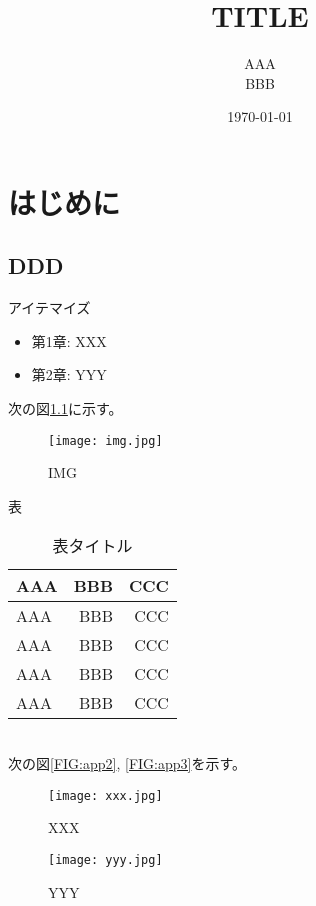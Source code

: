 \documentclass[a4paper,12pt,uplatex]{jsreport}
\title{TITLE}
\author{AAA\\BBB}
\date{\today}
\begin{document}
\maketitle
\tableofcontents

\chapter{はじめに}
\section{DDD}

アイテマイズ
\begin{itemize}
	\item 第1章: XXX
	\item 第2章: YYY
\end{itemize}


次の図\ref{FIG:p1}に示す。
\begin{figure}[h]
	\fontsize{12pt}{0cm}\selectfont
	\centering
	\renewcommand{\figurename}{図}
	\texttt{[image: img.jpg]}
	\caption{IMG}
	\label{FIG:p1}
\end{figure}

表
\begin{table}[htbp]
    \caption{表タイトル}
    \centering
    \begin{tabular}{|l||r|r|}
        \hline
        AAA & BBB & CCC\\
        \hline
        \hline
        AAA & BBB & CCC\\
        \hline
        AAA & BBB & CCC\\
        \hline
        AAA & BBB & CCC\\
        \hline
        AAA & BBB & CCC\\
        \hline
    \end{tabular}
    \label{TB:1}
\end{table}\\


次の図\ref{FIG:app2}, \ref{FIG:app3}を示す。\\
\begin{figure}[htbp]
	\begin{minipage}[b]{0.45\linewidth}
		\centering
		\texttt{[image: xxx.jpg]}
		\caption{XXX}
		\label{FIG:yyy}
	\end{minipage}
	\begin{minipage}[b]{0.45\linewidth}
		\centering
		\texttt{[image: yyy.jpg]}
		\caption{YYY}
		\label{FIG:xxx}
	\end{minipage}
\end{figure}\\
\end{document}
